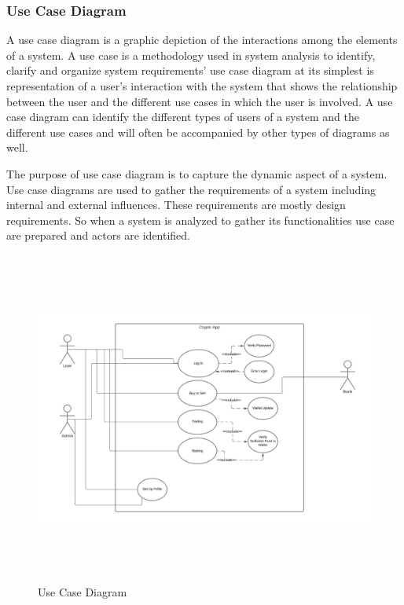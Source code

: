 \documentclass[12pt]{article}
\begin{document}
\newpage
\subsubsection{Use Case Diagram}

A use case diagram is a graphic depiction of the interactions among the
elements of a system. A use case is a methodology used in system analysis
to identify, clarify and organize system requirements’ use case diagram at its
simplest is representation of a user's interaction with the system that shows the
relationship between the user and the different use cases in which the user is
involved. A use case diagram can identify the different types of users of a system
and the different use cases and will often be accompanied by other types of
diagrams as well.
\par The purpose of use case diagram is to capture the dynamic aspect of a
system. Use case diagrams are used to gather the requirements of a system
including internal and external influences. These requirements are mostly design
requirements. So when a system is analyzed to gather its functionalities use case
are prepared and actors are identified.


\begin{figure}[h!]
\begin{center}
\includegraphics[width=17cm, height=11cm]{USE}
\caption{Use Case Diagram}
\end{center}
\end{figure}
\end{document}
